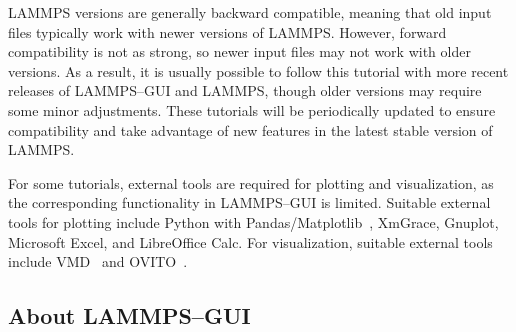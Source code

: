 \documentclass[9pt,tutorial]{livecoms}
\begin{document}
LAMMPS versions are generally backward compatible, meaning that old
input files typically work with newer versions of LAMMPS.  However,
forward compatibility is not as strong, so
newer input files may not work with older versions.  As a result, it is
usually possible to follow this tutorial with more recent releases of
LAMMPS--GUI and LAMMPS, though older versions may require some minor adjustments.
These tutorials will be periodically updated to ensure compatibility
and take advantage of new features in the latest stable version of LAMMPS.

For some tutorials, external tools are required for plotting and
visualization, as the corresponding functionality in LAMMPS--GUI is
limited.  Suitable external tools for plotting include Python with
Pandas/Matplotlib~\cite{van1995python,hunter2007Matplotlib}, XmGrace,
Gnuplot, Microsoft Excel, and LibreOffice Calc.  For visualization,
suitable external tools include VMD~\cite{vmd_home,humphrey1996vmd}
and OVITO~\cite{ovito_home,ovito_paper}.


\subsection{About LAMMPS--GUI}
\end{document}
